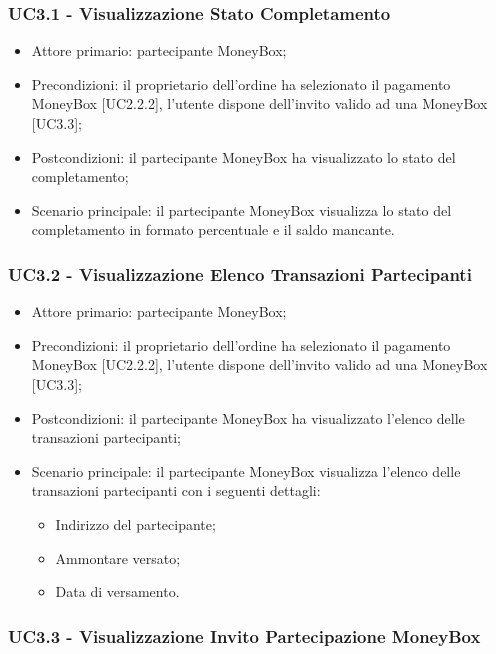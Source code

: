 \subsubsection{UC3.1 - Visualizzazione Stato Completamento}

\begin{itemize}
    \item Attore primario: partecipante MoneyBox\glo{};
    \item Precondizioni: il proprietario dell'ordine ha selezionato il pagamento MoneyBox\glo{} [UC2.2.2], 
            l'utente dispone dell'invito valido ad una MoneyBox\glo{} [UC3.3];
    \item Postcondizioni: il partecipante MoneyBox\glo{} ha visualizzato lo stato del completamento;
    \item Scenario principale: il partecipante MoneyBox\glo{} visualizza lo stato del completamento in formato percentuale e il saldo mancante.
\end{itemize}

\subsubsection{UC3.2 - Visualizzazione Elenco Transazioni Partecipanti}

\begin{itemize}
    \item Attore primario: partecipante MoneyBox\glo{};
    \item Precondizioni: il proprietario dell'ordine ha selezionato il pagamento MoneyBox\glo{} [UC2.2.2], 
            l'utente dispone dell'invito valido ad una MoneyBox\glo{} [UC3.3];
    \item Postcondizioni: il partecipante MoneyBox\glo{} ha visualizzato l'elenco delle transazioni partecipanti;
    \item Scenario principale: il partecipante MoneyBox\glo{} visualizza l'elenco delle transazioni partecipanti con i seguenti dettagli:
        \begin{itemize}
            \item Indirizzo del partecipante;
            \item Ammontare versato;
            \item Data di versamento.
        \end{itemize}
\end{itemize}

\subsubsection{UC3.3 - Visualizzazione Invito Partecipazione MoneyBox}

